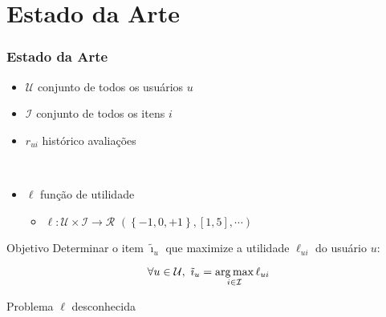 \section[Estado da Arte]{Estado da Arte}
\begin{frame}
\frametitle{Estado da Arte}
\begin{itemize}
	\item $\mathcal{U}$ conjunto de todos os usuários $u$ 
	\item $\mathcal{I}$ conjunto de todos os itens $i$ 
	\item $r_{ui}$ histórico avaliações \par{~}
	\item $\ell$ função de utilidade 
	\begin{itemize}
		\item $\ell: \mathcal{U} \times \mathcal{I} \rightarrow \mathcal{R}$ $\left(\left\{-1, 0, +1\right\}, \left[1, 5\right], \cdots\right)$
	\end{itemize}
\end{itemize}


\begin{block}{Objetivo}
Determinar o item $\tilde{\imath}_u$ que maximize a utilidade $\ell_{ui}$ do usuário $u$:


\begin{equation} 
\label{eq:utilidade}
\forall u \in \mathcal{U}, ~ \tilde{\imath}_u = \operatorname*{arg\,max}_{i \in \mathcal{I}}{\ell_{ui}}
\end{equation}
\end{block}

\begin{alertblock}{Problema}
$\ell$ desconhecida
\end{alertblock}
\end{frame}




